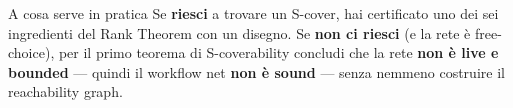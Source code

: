 \begin{boxtip}{A cosa serve in pratica}
Se \textbf{riesci} a trovare un S-cover, hai certificato uno dei sei ingredienti del Rank Theorem con un disegno. Se \textbf{non ci riesci} (e la rete è free-choice), per il primo teorema di S-coverability concludi che la rete \textbf{non è live e bounded} — quindi il workflow net \textbf{non è sound} — senza nemmeno costruire il reachability graph.
\end{boxtip}